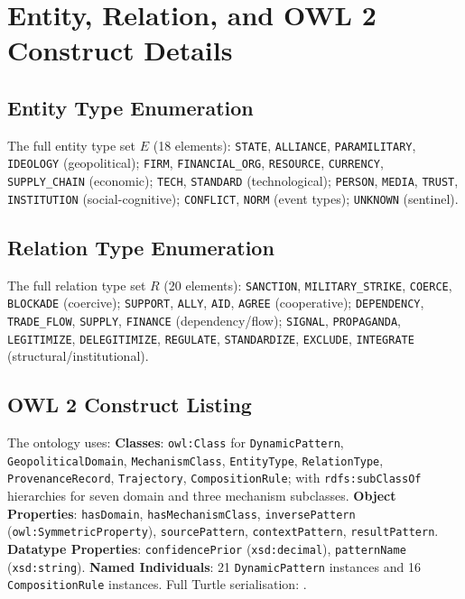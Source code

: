 \documentclass{llncs}
\begin{document}



\newpage
\appendix

\section{Entity, Relation, and OWL 2 Construct Details}
\label{app:schema}

\subsection*{Entity Type Enumeration}
The full entity type set $E$ (18 elements): \texttt{STATE}, \texttt{ALLIANCE}, \texttt{PARAMILITARY}, \texttt{IDEOLOGY} (geopolitical); \texttt{FIRM}, \texttt{FINANCIAL\_ORG}, \texttt{RESOURCE}, \texttt{CURRENCY}, \texttt{SUPPLY\_CHAIN} (economic); \texttt{TECH}, \texttt{STANDARD} (technological); \texttt{PERSON}, \texttt{MEDIA}, \texttt{TRUST}, \texttt{INSTITUTION} (social-cognitive); \texttt{CONFLICT}, \texttt{NORM} (event types); \texttt{UNKNOWN} (sentinel).

\subsection*{Relation Type Enumeration}
The full relation type set $R$ (20 elements): \texttt{SANCTION}, \texttt{MILITARY\_STRIKE}, \texttt{COERCE}, \texttt{BLOCKADE} (coercive); \texttt{SUPPORT}, \texttt{ALLY}, \texttt{AID}, \texttt{AGREE} (cooperative); \texttt{DEPENDENCY}, \texttt{TRADE\_FLOW}, \texttt{SUPPLY}, \texttt{FINANCE} (dependency/flow); \texttt{SIGNAL}, \texttt{PROPAGANDA}, \texttt{LEGITIMIZE}, \texttt{DELEGITIMIZE}, \texttt{REGULATE}, \texttt{STANDARDIZE}, \texttt{EXCLUDE}, \texttt{INTEGRATE} (structural/institutional).

\subsection*{OWL 2 Construct Listing}
The ontology uses: \textbf{Classes}: \texttt{owl:Class} for \texttt{DynamicPattern}, \texttt{GeopoliticalDomain}, \texttt{MechanismClass}, \texttt{EntityType}, \texttt{RelationType}, \texttt{ProvenanceRecord}, \texttt{Trajectory}, \texttt{CompositionRule}; with \texttt{rdfs:subClassOf} hierarchies for seven domain and three mechanism subclasses. \textbf{Object Properties}: \texttt{hasDomain}, \texttt{hasMechanismClass}, \texttt{inversePattern} (\texttt{owl:SymmetricProperty}), \texttt{sourcePattern}, \texttt{contextPattern}, \texttt{resultPattern}. \textbf{Datatype Properties}: \texttt{confidencePrior} (\texttt{xsd:decimal}), \texttt{patternName} (\texttt{xsd:string}). \textbf{Named Individuals}: 21 \texttt{DynamicPattern} instances and 16 \texttt{CompositionRule} instances. Full Turtle serialisation: .
\end{document}
